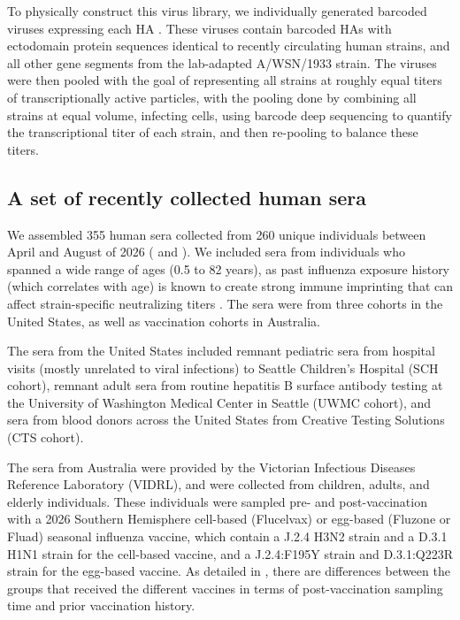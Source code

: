 To physically construct this virus library, we individually generated barcoded viruses expressing each HA \citep{kikawa2026b,loes2024}. These viruses contain barcoded HAs with ectodomain protein sequences identical to recently circulating human strains, and all other gene segments from the lab-adapted A/WSN/1933 strain. The viruses were then pooled with the goal of representing all strains at roughly equal titers of transcriptionally active particles, with the pooling done by combining all strains at equal volume, infecting cells, using barcode deep sequencing to quantify the transcriptional titer of each strain, and then re-pooling to balance these titers.

\subsection{A set of recently collected human sera}

\begin{table}[!tp]
\centering
\caption{\textbf{Human sera used in this study. Vaccination status in prior years is not known for the SCH, UWMC, and CTS sera.}}
\label{tab:sera_metadata}

\end{table}

We assembled 355 human sera collected from 260 unique individuals between April and August of 2026 (\textbf{} and \textbf{}). We included sera from individuals who spanned a wide range of ages (0.5 to 82 years), as past influenza exposure history (which correlates with age) is known to create strong immune imprinting that can affect strain-specific neutralizing titers \citep{cobey2017}. The sera were from three cohorts in the United States, as well as vaccination cohorts in Australia.

The sera from the United States included remnant pediatric sera from hospital visits (mostly unrelated to viral infections) to Seattle Children's Hospital (SCH cohort), remnant adult sera from routine hepatitis B surface antibody testing at the University of Washington Medical Center in Seattle (UWMC cohort), and sera from blood donors across the United States from Creative Testing Solutions (CTS cohort).

The sera from Australia were provided by the Victorian Infectious Diseases Reference Laboratory (VIDRL), and were collected from children, adults, and elderly individuals. These individuals were sampled pre- and post-vaccination with a 2026 Southern Hemisphere cell-based (Flucelvax) or egg-based (Fluzone or Fluad) seasonal influenza vaccine, which contain a J.2.4 H3N2 strain and a D.3.1 H1N1 strain for the cell-based vaccine, and a J.2.4:F195Y strain and D.3.1:Q223R strain for the egg-based vaccine. As detailed in \textbf{}, there are differences between the groups that received the different vaccines in terms of post-vaccination sampling time and prior vaccination history.


